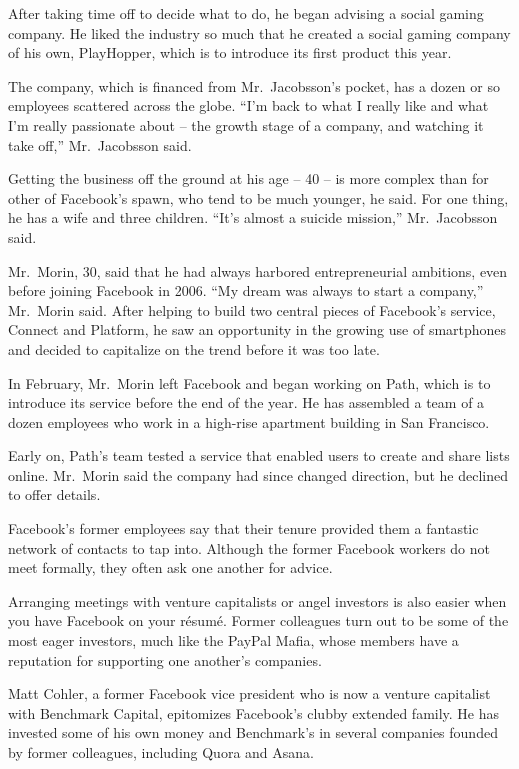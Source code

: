 ﻿\documentclass[12pt]{article}
\begin{document}
After taking time off to decide what to do, he began advising a social gaming company. He liked the
industry so much that he created a social gaming company of his own, PlayHopper, which is to
introduce its first product this year.

The company, which is financed from Mr.~Jacobsson's pocket, has a dozen or so employees scattered
across the globe. ``I'm back to what I really like and what I'm really passionate about -- the
growth stage of a company, and watching it take off,'' Mr.~Jacobsson said.

Getting the business off the ground at his age -- 40 -- is more complex than for other of Facebook's
spawn, who tend to be much younger, he said. For one thing, he has a wife and three children. ``It's
almost a suicide mission,'' Mr.~Jacobsson said.

Mr.~Morin, 30, said that he had always harbored entrepreneurial ambitions, even before joining
Facebook in 2006. ``My dream was always to start a company,'' Mr.~Morin said. After helping to build
two central pieces of Facebook's service, Connect and Platform, he saw an opportunity in the growing
use of smartphones and decided to capitalize on the trend before it was too late.

In February, Mr.~Morin left Facebook and began working on Path, which is to introduce its service
before the end of the year. He has assembled a team of a dozen employees who work in a high-rise
apartment building in San Francisco.

Early on, Path's team tested a service that enabled users to create and share lists online.
Mr.~Morin said the company had since changed direction, but he declined to offer details.

Facebook's former employees say that their tenure provided them a fantastic network of contacts to
tap into. Although the former Facebook workers do not meet formally, they often ask one another for
advice.

Arranging meetings with venture capitalists or angel investors is also easier when you have Facebook
on your r\'esum\'e. Former colleagues turn out to be some of the most eager investors, much like the
PayPal Mafia, whose members have a reputation for supporting one another's companies.

Matt Cohler, a former Facebook vice president who is now a venture capitalist with Benchmark
Capital, epitomizes Facebook's clubby extended family. He has invested some of his own money and
Benchmark's in several companies founded by former colleagues, including Quora and Asana.
\end{document}
